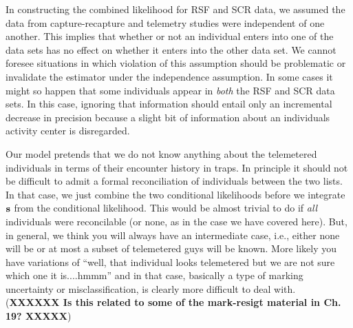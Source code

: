 In constructing the combined likelihood for RSF and SCR data, we
assumed the data from capture-recapture and telemetry studies were
independent of one another. This implies that whether or not an
individual enters into one of the data sets has no effect on whether
it enters into the other data set.  We cannot foresee situations in
which violation of this assumption should be problematic or invalidate
the estimator under the independence assumption.  In some cases it
might so happen that some individuals appear in {\it both} the RSF and
SCR data sets. In this case, ignoring that information should entail
only an incremental decrease in precision because a slight bit of
information about an individuals activity center is disregarded.

 Our model pretends that we do not know anything
about the telemetered individuals in terms of their encounter history
in traps.  In principle it should not be difficult to admit a formal
reconciliation of individuals between the two lists. In that case, we
just combine the two conditional likelihoods before we integrate ${\bf
  s}$ from the conditional likelihood. This would be almost trivial to
do if {\it all} individuals were reconcilable (or none, as in the case
we have covered here). But, in general, we think you will always have
an intermediate case, i.e., either none will be or at most a subset
of telemetered guys will be known. More likely you have variations of ``well, that
individual looks telemetered but we are not sure which one it is....hmmm'' and
in that case, basically a type of marking uncertainty or
misclassification, is clearly more difficult to deal with.
({\bf XXXXXX Is this related to some of the mark-resigt material in
  Ch. 19? XXXXX})   %


